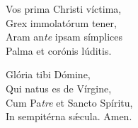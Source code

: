 Vos prima Christi ví\-ctima,\\
Grex immolatórum tener,\\
Aram an\textit{te} i\-psam símplices\\
Palma et corónis lúditis.

Glória tibi Dómine,\\
Qui natus es de Vírgine,\\
Cum Pa\tinyhspace\textit{tre} et San\-cto Spíritu,\\
In sempitérna sǽcula.
Amen.